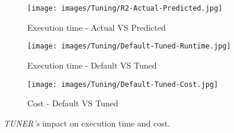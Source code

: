 \documentclass[3p]{elsarticle}
\begin{document}
\begin{figure*}[!tbp]
\centering
\begin{subfigure}{.33\textwidth}
  \centering
  \texttt{[image: images/Tuning/R2-Actual-Predicted.jpg]}
  \caption{Execution time - Actual VS Predicted}
  \label{actual_predicted_time}
\end{subfigure}%
\begin{subfigure}{.33\textwidth}
  \centering
  \texttt{[image: images/Tuning/Default-Tuned-Runtime.jpg]}
  \caption{Execution time - Default VS Tuned}
  \label{default_tuned_time}
\end{subfigure}
\begin{subfigure}{.3\textwidth}
  \centering
  \texttt{[image: images/Tuning/Default-Tuned-Cost.jpg]}
  \caption{Cost - Default VS Tuned}
  \label{default_tuned_cost}
\end{subfigure}
\caption{\textit{TUNER's} impact on execution time and cost.}
\label{improvement_figure}
\end{figure*}
\end{document}
